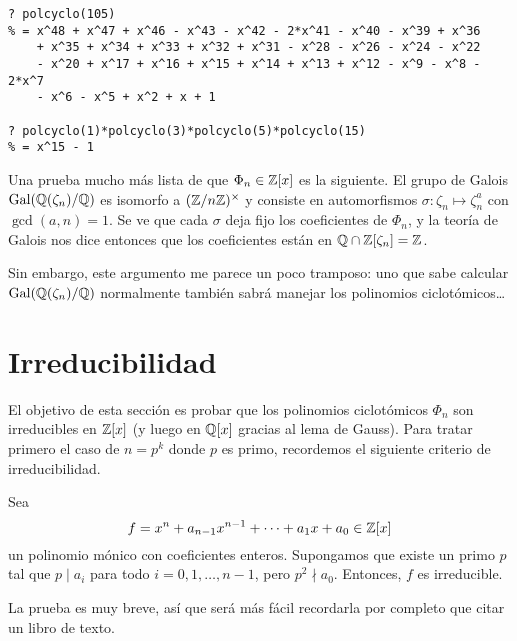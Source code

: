 \begin{shaded}
\begin{verbatim}
? polcyclo(105)
% = x^48 + x^47 + x^46 - x^43 - x^42 - 2*x^41 - x^40 - x^39 + x^36
    + x^35 + x^34 + x^33 + x^32 + x^31 - x^28 - x^26 - x^24 - x^22
    - x^20 + x^17 + x^16 + x^15 + x^14 + x^13 + x^12 - x^9 - x^8 - 2*x^7
    - x^6 - x^5 + x^2 + x + 1

? polcyclo(1)*polcyclo(3)*polcyclo(5)*polcyclo(15)
% = x^15 - 1
\end{verbatim}
\end{shaded}

\begin{comentario}
  Una prueba mucho más lista de que $\Phi_n \in \mathbb{Z} [x]$ es la siguiente.
  El grupo de Galois $\operatorname{Gal} (\mathbb{Q} (\zeta_n)/\mathbb{Q})$ es isomorfo a
  $(\mathbb{Z}/n\mathbb{Z})^\times$ y consiste en automorfismos
  $\sigma\colon \zeta_n \mapsto \zeta_n^a$ con $\gcd (a,n) = 1$. Se ve que cada
  $\sigma$ deja fijo los coeficientes de $\Phi_n$, y la teoría de Galois nos
  dice entonces que los coeficientes están en $\mathbb{Q} \cap \mathbb{Z} [\zeta_n] = \mathbb{Z}$.

  Sin embargo, este argumento me parece un poco tramposo: uno que sabe calcular
  $\operatorname{Gal} (\mathbb{Q} (\zeta_n)/\mathbb{Q})$ normalmente también sabrá manejar los polinomios
  ciclotómicos\dots
\end{comentario}


\section{Irreducibilidad}

El objetivo de esta sección es probar que los polinomios ciclotómicos $\Phi_n$
son irreducibles en $\mathbb{Z} [x]$ (y luego en $\mathbb{Q} [x]$ gracias al lema de
Gauss). Para tratar primero el caso de $n = p^k$ donde $p$ es primo, recordemos
el siguiente criterio de irreducibilidad.

\begin{proposicion}[Eisenstein]
  Sea
  $$f = x^n + a_{n-1} x^{n-1} + \cdots + a_1 x + a_0 \in \mathbb{Z} [x]$$
  un polinomio mónico con coeficientes enteros. Supongamos que existe un primo
  $p$ tal que $p \mid a_i$ para todo $i = 0,1,\ldots,n-1$, pero $p^2 \nmid
  a_0$. Entonces, $f$ es irreducible.
\end{proposicion}

La prueba es muy breve, así que será más fácil recordarla por completo que citar
un libro de texto.

